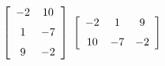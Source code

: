 {$\left[ \begin {array}{cc} -2&10\\\noalign{\medskip}1&-7
\\\noalign{\medskip}9&-2\end {array} \right] $}
{$\left[ \begin {array}{ccc} -2&1&9\\\noalign{\medskip}10&-7&-2
\end {array} \right]$}

